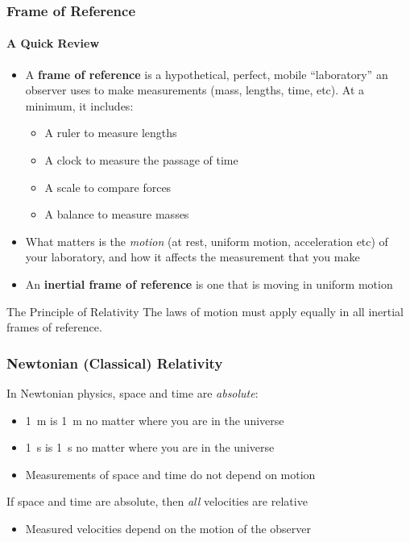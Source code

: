 \documentclass[12pt,compress,aspectratio=169]{beamer}
\begin{document}
\begin{frame}
  \frametitle{Frame of Reference}
  \framesubtitle{A Quick Review}
  \begin{itemize}
  \item A \textbf{frame of reference} is a hypothetical, perfect, mobile
    ``laboratory'' an observer uses to make measurements (mass, lengths, time,
    etc). At a minimum, it includes:
    \begin{itemize}
    \item A ruler to measure lengths
    \item A clock to measure the passage of time
    \item A scale to compare forces
    \item A balance to measure masses
    \end{itemize}
  \item What matters is the \emph{motion} (at rest, uniform motion, acceleration
    etc) of your laboratory, and how it affects the measurement that you make
  \item An \textbf{inertial frame of reference} is one that is moving in
    uniform motion
  \end{itemize}
  
  \vspace{.1in}
  \begin{block}{The Principle of Relativity}
    The laws of motion must apply equally in all inertial frames of reference.
  \end{block}
\end{frame}


\begin{frame}
  \frametitle{Newtonian (Classical) Relativity}
  In Newtonian physics, space and time are \emph{absolute}:
  \begin{itemize}
  \item \SI{1}{m} is \SI{1}{m} no matter where you are in the universe
  \item \SI{1}{s} is \SI{1}{s} no matter where you are in the universe
  \item Measurements of space and time do not depend on motion
  \end{itemize}
  If space and time are absolute, then \emph{all} velocities are relative
  \begin{itemize}
  \item Measured velocities depend on the motion of the observer
  \end{itemize}
\end{frame}
\end{document}
